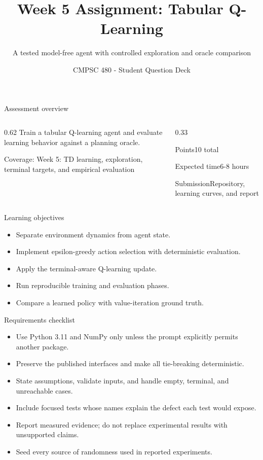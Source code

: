 \documentclass[aspectratio=169,11pt]{beamer}
\title[Week 5 Assignment Questions]{Week 5 Assignment: Tabular Q-Learning}
\subtitle{A tested model-free agent with controlled exploration and oracle comparison}
\author{CMPSC 480 - Student Question Deck}
\date{}
\begin{document}
\begin{frame}
  \titlepage
\end{frame}

\begin{frame}{Assessment overview}
\begin{columns}[T,onlytextwidth]
\begin{column}{0.62\textwidth}
\Large Train a tabular Q-learning agent and evaluate learning behavior against a planning oracle.

\vspace{0.35cm}
\normalsize
Coverage: Week 5: TD learning, exploration, terminal targets, and empirical evaluation
\end{column}
\begin{column}{0.33\textwidth}
\begin{block}{Points}10 total\end{block}
\begin{block}{Expected time}6-8 hours\end{block}
\begin{block}{Submission}Repository, learning curves, and report\end{block}
\end{column}
\end{columns}
\end{frame}

\begin{frame}{Learning objectives}
\begin{itemize}
  \item Separate environment dynamics from agent state.
  \item Implement epsilon-greedy action selection with deterministic evaluation.
  \item Apply the terminal-aware Q-learning update.
  \item Run reproducible training and evaluation phases.
  \item Compare a learned policy with value-iteration ground truth.
\end{itemize}
\end{frame}

\begin{frame}{Requirements checklist}
\small
\begin{itemize}
  \item Use Python 3.11 and NumPy only unless the prompt explicitly permits another package.
  \item Preserve the published interfaces and make all tie-breaking deterministic.
  \item State assumptions, validate inputs, and handle empty, terminal, and unreachable cases.
  \item Include focused tests whose names explain the defect each test would expose.
  \item Report measured evidence; do not replace experimental results with unsupported claims.
  \item Seed every source of randomness used in reported experiments.
\end{itemize}
\end{frame}
\end{document}
